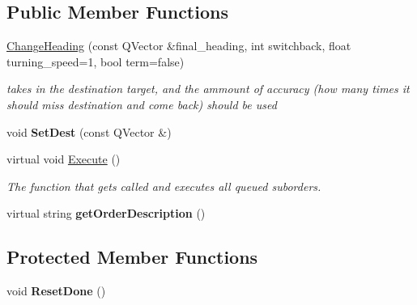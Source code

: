 \subsection*{Public Member Functions}
\begin{DoxyCompactItemize}
\item 
\hyperlink{classOrders_1_1ChangeHeading_a40a3f6807b8ce84cdabddc3a0086cd1f}{Change\+Heading} (const Q\+Vector \&final\+\_\+heading, int switchback, float turning\+\_\+speed=1, bool term=false)\hypertarget{classOrders_1_1ChangeHeading_a40a3f6807b8ce84cdabddc3a0086cd1f}{}\label{classOrders_1_1ChangeHeading_a40a3f6807b8ce84cdabddc3a0086cd1f}

\begin{DoxyCompactList}\small\item\em takes in the destination target, and the ammount of accuracy (how many times it should miss destination and come back) should be used \end{DoxyCompactList}\item 
void {\bfseries Set\+Dest} (const Q\+Vector \&)\hypertarget{classOrders_1_1ChangeHeading_abc23c29dcc1830d1c8e945d752364d23}{}\label{classOrders_1_1ChangeHeading_abc23c29dcc1830d1c8e945d752364d23}

\item 
virtual void \hyperlink{classOrders_1_1ChangeHeading_af63f4b951775ccdf0d02e65422be3e46}{Execute} ()\hypertarget{classOrders_1_1ChangeHeading_af63f4b951775ccdf0d02e65422be3e46}{}\label{classOrders_1_1ChangeHeading_af63f4b951775ccdf0d02e65422be3e46}

\begin{DoxyCompactList}\small\item\em The function that gets called and executes all queued suborders. \end{DoxyCompactList}\item 
virtual string {\bfseries get\+Order\+Description} ()\hypertarget{classOrders_1_1ChangeHeading_a093fef960492b36c4a4b086cb19487d4}{}\label{classOrders_1_1ChangeHeading_a093fef960492b36c4a4b086cb19487d4}

\end{DoxyCompactItemize}
\subsection*{Protected Member Functions}
\begin{DoxyCompactItemize}
\item 
void {\bfseries Reset\+Done} ()\hypertarget{classOrders_1_1ChangeHeading_abf53d79fd7baaadaead3bccfa3c02241}{}\label{classOrders_1_1ChangeHeading_abf53d79fd7baaadaead3bccfa3c02241}

\end{DoxyCompactItemize}
